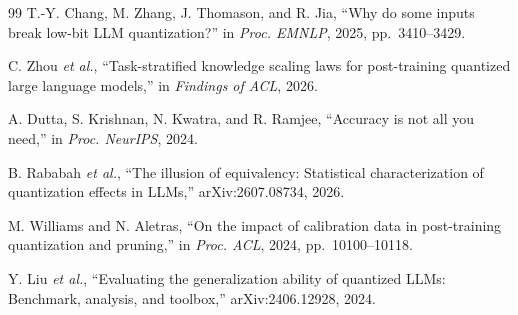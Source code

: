 \documentclass[10pt,twocolumn]{article}
\begin{document}
\begin{thebibliography}{99}
 T.-Y. Chang, M. Zhang, J. Thomason, and R. Jia, ``Why do
some inputs break low-bit LLM quantization?'' in \emph{Proc. EMNLP},
2025, pp.~3410--3429.

 C. Zhou \emph{et al.}, ``Task-stratified knowledge scaling
laws for post-training quantized large language models,'' in
\emph{Findings of ACL}, 2026.

 A. Dutta, S. Krishnan, N. Kwatra, and R. Ramjee,
``Accuracy is not all you need,'' in \emph{Proc. NeurIPS}, 2024.

 B. Rababah \emph{et al.}, ``The illusion of equivalency:
Statistical characterization of quantization effects in LLMs,''
arXiv:2607.08734, 2026.

 M. Williams and N. Aletras, ``On the impact of calibration
data in post-training quantization and pruning,'' in \emph{Proc. ACL},
2024, pp.~10100--10118.

 Y. Liu \emph{et al.}, ``Evaluating the generalization
ability of quantized LLMs: Benchmark, analysis, and toolbox,''
arXiv:2406.12928, 2024.

\end{thebibliography}
\end{document}
